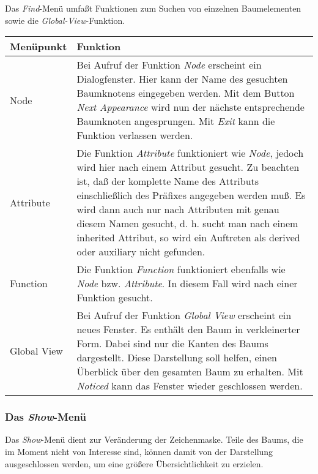 Das {\it Find}-Men\"u umfa\ss{}t Funktionen zum Suchen von einzelnen Baumelementen sowie die {\it Global-View}-Funktion.

\bigskip
\begin{tabular}{|l|p{10.0cm}|}
\hline
Men\"upunkt               & Funktion      \\
\hline
Node     &
Bei Aufruf der Funktion {\it Node} erscheint ein Dialogfenster. Hier kann der Name des gesuchten Baumknotens eingegeben werden. Mit dem Button
{\it Next Appearance} wird nun der n\"achste entsprechende Baumknoten angesprungen. Mit {\it Exit} kann die Funktion verlassen werden. \\ Attribute &
Die Funktion {\it Attribute} funktioniert wie {\it Node}, jedoch wird hier nach einem Attribut gesucht. Zu beachten ist, da\ss{} der
komplette Name des Attributs einschlie\ss{}lich des Pr\"afixes angegeben werden mu\ss{}. Es wird dann auch nur nach Attributen mit genau diesem Namen gesucht,
d. h. sucht man nach einem inherited Attribut, so wird ein Auftreten als derived oder auxiliary nicht gefunden. \\ Function & Die Funktion
{\it Function} funktioniert ebenfalls wie {\it Node} bzw. {\it Attribute}. In diesem Fall wird nach einer Funktion
gesucht. \\ Global View & Bei Aufruf der Funktion {\it Global View} erscheint ein neues Fenster. Es enth\"alt den Baum in verkleinerter Form. Dabei sind
nur die Kanten des Baums dargestellt. Diese Darstellung soll helfen, einen \"Uberblick \"uber den gesamten Baum zu erhalten. Mit {\it Noticed} kann das
Fenster wieder geschlossen werden. \\ \hline \end{tabular}

\subsubsection{Das {\it Show}-Men\"u}

Das {\it Show}-Men\"u dient zur Ver\"anderung der Zeichenmaske. Teile des Baums, die im Moment nicht von Interesse sind, k\"onnen damit von der Darstellung
ausgeschlossen werden, um eine gr\"o\ss{}ere \"Ubersichtlichkeit zu erzielen.

